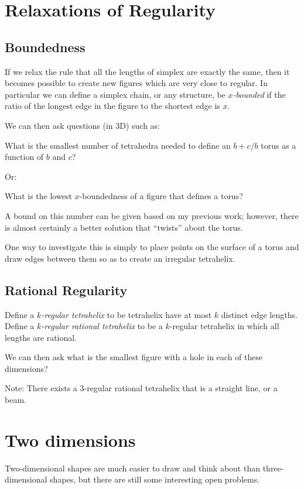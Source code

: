 \documentclass[11pt]{article}
\begin{document}
\section{Relaxations of Regularity}
\subsection{Boundedness}

If we relax the rule that all the lengths of simplex are exactly the same, then it becomes possible to create new figures which are
very close to regular. In particular we can define a simplex chain, or any structure, be {\em $x$-bounded} if the ratio of the longest edge
in the figure to the shortest edge is $x$.

We can then ask questions (in 3D) such as:

What is the smallest number of tetrahedra needed to define an $b+c/b$ torus as a function of $b$ and $c$?

Or:

What is the lowest $x$-boundedness of a figure that defines a torus?

A bound on this number can be given based on my previous work; however, there is almost certainly a better solution that ``twists'' about the torus.

One way to investigate this is simply to place points on the surface of a torus and draw edges between them so as to create an irregular tetrahelix.

\subsection{Rational Regularity}

Define a {\em $k$-regular tetrahelix} to be tetrahelix have at most $k$ distinct edge lengths.
Define a {\em $k$-regular rational tetrahelix} to be a $k$-regular tetrahelix in which all lengths are rational.

We can then ask what is the smallest figure with a hole in each of these dimensions?

Note: There exists a 3-regular rational tetrahelix that is a straight line, or a beam.


\section{Two dimensions}

Two-dimensional shapes are much easier to draw and think about than three-dimensional shapes, but there are still
some interesting open problems.
\end{document}

